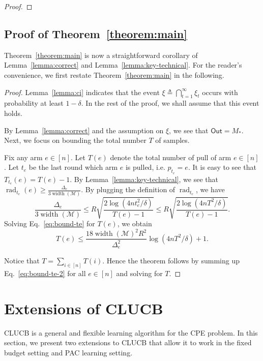 \documentclass{article}
\newcommand{\Algorithm}{{\small \textsf{CLUCB}}\xspace}
\newcommand{\Problem}{{CPE}\xspace}
\newcommand{\M}{\mathcal M}
\DeclareMathOperator{\rank}{width}
\DeclareMathOperator{\rad}{rad}
\newcommand{\out}{\mathsf{Out}}
\begin{document}
\begin{proof}
\end{proof}


\subsection{Proof of Theorem~\ref{theorem:main}}

Theorem~\ref{theorem:main} is now a straightforward corollary of Lemma~\ref{lemma:correct} and Lemma~\ref{lemma:key-technical}.
For the reader's convenience, we first restate Theorem~\ref{theorem:main} in the following.
\mainresult*

\begin{proof}
Lemma~\ref{lemma:ci} indicates that the event $\xi \triangleq \bigcap_{t=1}^\infty \xi_t$ occurs with probability at least $1-\delta$.
In the rest of the proof, we shall assume that this event holds.

By Lemma~\ref{lemma:correct} and the assumption on $\xi$, we see that $\out=M_*$.
Next, we focus on bounding the total number $T$ of samples.

Fix any arm $e\in [n]$.
Let $T(e)$ denote the total number of pull of arm $e\in [n]$.
Let $t_e$ be the last round which arm $e$ is pulled, i.e. $p_{t_e} = e$. 
It is easy to see that 
$T_{t_e}(e) = T(e) - 1$.
By Lemma~\ref{lemma:key-technical}, we see that 
$\rad_{t_e}(e) \ge \frac{\Delta_e}{3\rank(\M)}$.
By plugging the definition of $\rad_{t_e}$, we have
\begin{equation}
\frac{\Delta_e}{3\rank(\M)} \le 
R\sqrt{\frac{2\log\left(4n t_e^2/\delta\right)}{T(e)-1}} \le
R\sqrt{\frac{2\log\left(4n T^2/\delta\right)}{T(e)-1}}.
\label{eq:bound-te}
\end{equation}
Solving Eq.~\eqref{eq:bound-te} for $T(e)$, we obtain
\begin{equation}
\label{eq:bound-te-2}
T(e) \le \frac{18 \rank(\M)^2 R^2}{\Delta_e^2} \log(4nT^2/\delta)+1.
\end{equation}

Notice that $T=\sum_{i\in[n]} T(i)$. 
Hence the theorem follows by summing up Eq.~\eqref{eq:bound-te-2} for all $e\in [n]$ and solving for $T$.
\end{proof}


\section{Extensions of \Algorithm}
\label{section:extensions}

\Algorithm is a general and flexible learning algorithm for the \Problem problem.
In this section, we present two extensions to \Algorithm that allow it to work in the fixed budget setting and PAC learning setting.
\end{document}
